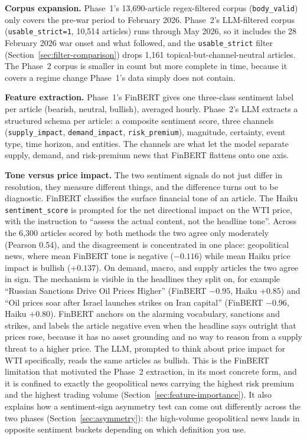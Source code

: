 \textbf{Corpus expansion.} Phase~1's 13{,}690-article regex-filtered corpus (\texttt{body\_valid}) only covers the pre-war period to February 2026. Phase~2's LLM-filtered corpus (\texttt{usable\_strict=1}, 10{,}514 articles) runs through May 2026, so it includes the 28 February 2026 war onset and what followed, and the \texttt{usable\_strict} filter (Section~\ref{sec:filter-comparison}) drops 1{,}161 topical-but-channel-neutral articles. The Phase~2 corpus is smaller in count but more complete in time, because it covers a regime change Phase~1's data simply does not contain.

\textbf{Feature extraction.} Phase~1's FinBERT gives one three-class sentiment label per article (bearish, neutral, bullish), averaged hourly. Phase~2's LLM extracts a structured schema per article: a composite sentiment score, three channels (\texttt{supply\_impact}, \texttt{demand\_impact}, \texttt{risk\_premium}), magnitude, certainty, event type, time horizon, and entities. The channels are what let the model separate supply, demand, and risk-premium news that FinBERT flattens onto one axis.

\textbf{Tone versus price impact.} The two sentiment signals do not just differ in resolution, they measure different things, and the difference turns out to be diagnostic. FinBERT classifies the surface financial tone of an article. The Haiku \texttt{sentiment\_score} is prompted for the net directional impact on the WTI price, with the instruction to ``assess the actual content, not the headline tone''. Across the 6{,}300 articles scored by both methods the two agree only moderately (Pearson 0.54), and the disagreement is concentrated in one place: geopolitical news, where mean FinBERT tone is negative ($-0.116$) while mean Haiku price impact is bullish ($+0.137$). On demand, macro, and supply articles the two agree in sign. The mechanism is visible in the headlines they split on, for example ``Russian Sanctions Drive Oil Prices Higher'' (FinBERT $-0.95$, Haiku $+0.85$) and ``Oil prices soar after Israel launches strikes on Iran capital'' (FinBERT $-0.96$, Haiku $+0.80$). FinBERT anchors on the alarming vocabulary, sanctions and strikes, and labels the article negative even when the headline says outright that prices rose, because it has no asset grounding and no way to reason from a supply threat to a higher price. The LLM, prompted to think about price impact for WTI specifically, reads the same articles as bullish. This is the FinBERT limitation that motivated the Phase~2 extraction, in its most concrete form, and it is confined to exactly the geopolitical news carrying the highest risk premium and the highest trading volume (Section~\ref{sec:feature-importance}). It also explains how a sentiment-sign asymmetry test can come out differently across the two phases (Section~\ref{sec:asymmetry}): the high-volume geopolitical news lands in opposite sentiment buckets depending on which definition you use.

